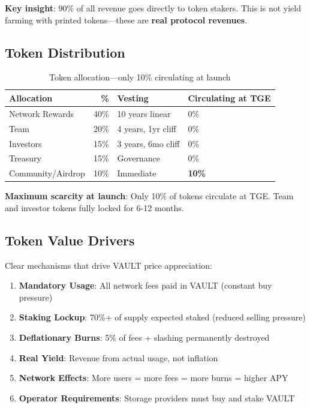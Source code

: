 \documentclass[12pt,a4paper]{article}
\begin{document}
\noindent \textbf{Key insight}: 90\% of all revenue goes directly to token stakers. This is not yield farming with printed tokens—these are \textbf{real protocol revenues}.

\subsection{Token Distribution}

\begin{table}[h]
\centering
\begin{tabular}{@{}lrll@{}}
\toprule
\textbf{Allocation} & \textbf{\%} & \textbf{Vesting} & \textbf{Circulating at TGE} \\
\midrule
Network Rewards & 40\% & 10 years linear & 0\% \\
Team & 20\% & 4 years, 1yr cliff & 0\% \\
Investors & 15\% & 3 years, 6mo cliff & 0\% \\
Treasury & 15\% & Governance & 0\% \\
Community/Airdrop & 10\% & Immediate & \textbf{10\%} \\
\bottomrule
\end{tabular}
\caption{Token allocation—only 10\% circulating at launch}
\end{table}

\noindent \textbf{Maximum scarcity at launch}: Only 10\% of tokens circulate at TGE. Team and investor tokens fully locked for 6-12 months.

\subsection{Token Value Drivers}

Clear mechanisms that drive VAULT price appreciation:

\begin{enumerate}
    \item \textbf{Mandatory Usage}: All network fees paid in VAULT (constant buy pressure)
    \item \textbf{Staking Lockup}: 70\%+ of supply expected staked (reduced selling pressure)
    \item \textbf{Deflationary Burns}: 5\% of fees + slashing permanently destroyed
    \item \textbf{Real Yield}: Revenue from actual usage, not inflation
    \item \textbf{Network Effects}: More users = more fees = more burns = higher APY
    \item \textbf{Operator Requirements}: Storage providers must buy and stake VAULT
\end{enumerate}
\end{document}

